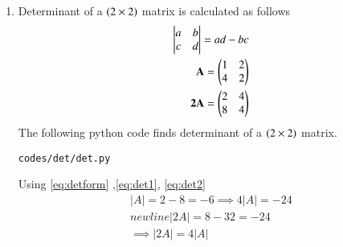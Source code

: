 \renewcommand{\theequation}{\theenumi}
\begin{enumerate}[label=\thesection.\arabic*.,ref=\thesection.\theenumi]

\item Determinant of a $\left(2 \times 2\right)$ matrix is calculated as follows
\begin{align}
\begin{vmatrix} a & b \\ c & d \end{vmatrix} = ad-bc
\label{eq:detform}
\\
\mathbf{A}=\begin{pmatrix}1&2\\4&2\end{pmatrix}
\label{eq:det1}
\\
\mathbf{2A}=\begin{pmatrix}2&4\\8&4\end{pmatrix}
\label{eq:det2}
\end{align}
The following python code finds determinant of a $\left(2 \times 2\right)$ matrix.
\begin{lstlisting}
codes/det/det.py
\end{lstlisting}
Using \ref{eq:detform} ,\ref{eq:det1}, \ref{eq:det2}
\begin{align}
|A|=2-8=-6 \implies 4|A|=-24
\\newline
|2A|= 8-32=-24
\\
\implies |2A|=4|A|
\end{align}
\end{enumerate}
